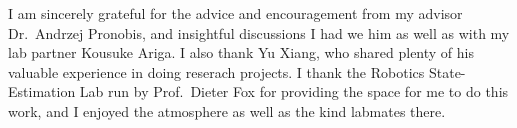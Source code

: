 \documentclass[11pt, titlepage]{article}
\theoremstyle{definition}
\begin{document}
I am sincerely grateful for the advice and encouragement from my advisor Dr.~Andrzej Pronobis, and insightful discussions I had we him as well as with my lab partner Kousuke Ariga. I also thank Yu Xiang, who shared plenty of his valuable experience in doing reserach projects. I thank the Robotics State-Estimation Lab run by Prof.~Dieter Fox for providing the space for me to do this work, and I enjoyed the atmosphere as well as the kind labmates there.


\nocite{*}




\newpage
\appendix
\end{document}
